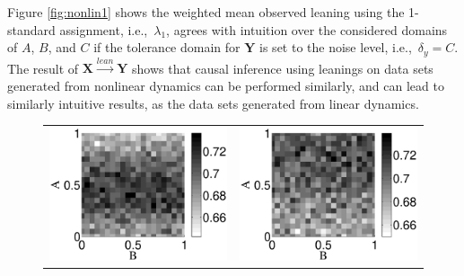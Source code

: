 \documentclass[twocolumn,aps,pre,groupedaddress]{revtex4-1}
\begin{document}
Figure \ref{fig:nonlin1} shows the weighted mean observed leaning using the 1-standard assignment, i.e.,\ $\lambda_1$, agrees with intuition over the considered domains of $A$, $B$, and $C$ if the tolerance domain for $\mathbf{Y}$ is set to the noise level, i.e.,\ $\delta_y = C$.  The result of $\mathbf{X}\xrightarrow{lean}\mathbf{Y}$ shows that causal inference using leanings on data sets generated from nonlinear dynamics can be performed similarly, and can lead to similarly intuitive results, as the data sets generated from linear dynamics.
\begin{figure}[ht]
\begin{tabular}{cc}
\includegraphics[scale=0.34]{NonlinearCyclicexample_BxytolC02.eps} &
\includegraphics[scale=0.34]{NonlinearCyclicexample_BxytolC04.eps} \\

\end{tabular}
\end{figure}
\end{document}
